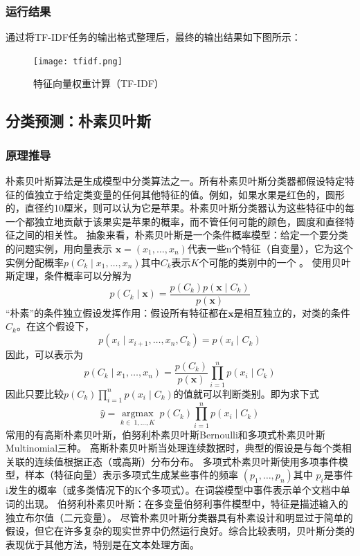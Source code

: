 \documentclass[lang=cn,11pt]{elegantpaper}
\begin{document}
\subsubsection{运行结果}
通过将TF-IDF任务的输出格式整理后，最终的输出结果如下图所示：
\begin{figure}[H]
	\centering
	\texttt{[image: tfidf.png]}
	\caption{特征向量权重计算（TF-IDF） \label{fig:tfidf}}
\end{figure}
\subsection{分类预测：朴素贝叶斯}
\subsubsection{原理推导}
朴素贝叶斯算法是生成模型中分类算法之一。所有朴素贝叶斯分类器都假设特定特征的值独立于给定类变量的任何其他特征的值。例如，如果水果是红色的，圆形的，直径约10厘米，则可以认为它是苹果。朴素贝叶斯分类器认为这些特征中的每一个都独立地贡献于该果实是苹果的概率，而不管任何可能的颜色，圆度和直径特征之间的相关性。
抽象来看，朴素贝叶斯是一个条件概率模型：给定一个要分类的问题实例，用向量表示 $ \mathbf {x} =(x_ {1} , \dots, x_ {n})$代表一些n个特征（自变量），它为这个实例分配概率$p(C_ {k} \mid x_ {1}, \dots, x_ {n})$其中$C_{k}$表示$K$个可能的类别中的一个 。
使用贝叶斯定理，条件概率可以分解为
$$p(C_ {k} \mid \mathbf {x})= {\frac {p(C_ {k})p (\mathbf {x} \mid C_ {k})} {p(\mathbf {x} )}}$$
“朴素”的条件独立假设发挥作用：假设所有特征都在$\mathbf {x}$是相互独立的，对类的条件$ C_ {k}$。在这个假设下，
$$p(x_ {i}\mid x_ {i+1},\dots,x_ {n},C_ {k})= p(x_ {i} \mid C_ {k})$$
因此，可以表示为
$$p(C_ {k} \mid x_ {1},\dots,x_ {n})= \frac{p(C_ {k})}{p(\mathbf {x})}\prod_ {i = 1}^{n} p(x_ {i} \mid C_ {k})$$
因此只要比较$p(C_ {k})\prod_ {i = 1}^{n} p(x_ {i} \mid C_ {k})$的值就可以判断类别。即为求下式
$$\hat{y} = {\underset {k \in \ {1,\dots,K}} {\operatorname {argmax}}} \ p(C_ {k})\prod_{i = 1} ^ {n} p(x_ {i} \mid C_ {k})$$
常用的有高斯朴素贝叶斯，伯努利朴素贝叶斯Bernoulli和多项式朴素贝叶斯Multinomial三种。
高斯朴素贝叶斯当处理连续数据时，典型的假设是与每个类相关联的连续值根据正态（或高斯）分布分布。
多项式朴素贝叶斯使用多项事件模型，样本（特征向量）表示多项式生成某些事件的频率 $(p_ {1},\dots,p_ {n})$其中 $p_i$是事件i发生的概率（或多类情况下的K个多项式）。在词袋模型中事件表示单个文档中单词的出现。
伯努利朴素贝叶斯：在多变量伯努利事件模型中，特征是描述输入的独立布尔值（二元变量）。
尽管朴素贝叶斯分类器具有朴素设计和明显过于简单的假设，但它在许多复杂的现实世界中仍然运行良好。综合比较表明，贝叶斯分类的表现优于其他方法，特别是在文本处理方面。
\end{document}
